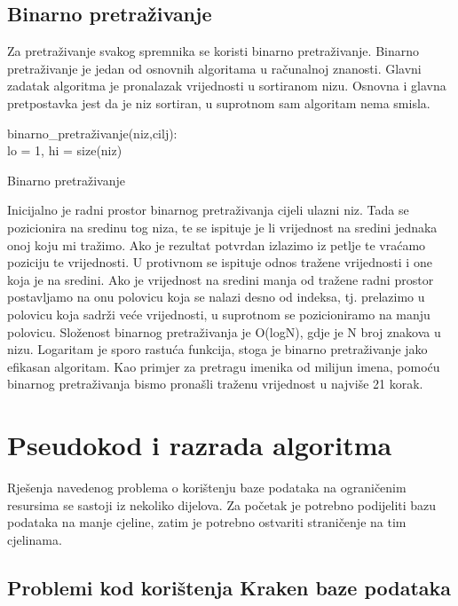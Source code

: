 \documentclass[times, utf8, zavrsni]{fer}
\begin{document}
\section{Binarno pretraživanje}
Za pretraživanje svakog spremnika se koristi binarno pretraživanje. Binarno pretraživanje je jedan od osnovnih algoritama u računalnoj znanosti. Glavni zadatak algoritma je pronalazak vrijednosti u sortiranom nizu. Osnovna i glavna pretpostavka jest da je niz sortiran, u suprotnom sam algoritam nema smisla.
\newline
\newline
\begin{algorithm}[H]
	binarno\_pretraživanje(niz,cilj):\\
	lo = 1, hi = size(niz)\;
	\caption{Binarno pretraživanje}
	\label{BinarnoP}
\end{algorithm}

Inicijalno je radni prostor binarnog pretraživanja cijeli ulazni niz. Tada se pozicionira na sredinu tog niza, te se ispituje je li vrijednost na sredini jednaka onoj koju mi tražimo. Ako je rezultat potvrdan izlazimo iz petlje te vraćamo poziciju te vrijednosti. U protivnom se ispituje odnos tražene vrijednosti i one koja je na sredini. Ako je vrijednost na sredini manja od tražene radni prostor postavljamo na onu polovicu koja se nalazi desno od indeksa, tj. prelazimo u  polovicu koja sadrži veće vrijednosti, u suprotnom se pozicioniramo na manju polovicu. Složenost binarnog pretraživanja je O(logN), gdje je N broj znakova u nizu. Logaritam je sporo rastuća funkcija, stoga je binarno pretraživanje jako efikasan algoritam. Kao primjer za pretragu imenika od milijun imena, pomoću binarnog pretraživanja bismo pronašli traženu vrijednost u najviše 21 korak.


\chapter{Pseudokod i razrada algoritma}
Rješenja navedenog problema o korištenju baze podataka na ograničenim resursima se sastoji iz nekoliko dijelova. Za početak je potrebno podijeliti bazu podataka na manje cjeline, zatim je potrebno ostvariti straničenje na tim cjelinama.
\section{Problemi kod korištenja Kraken baze podataka}
\end{document}
